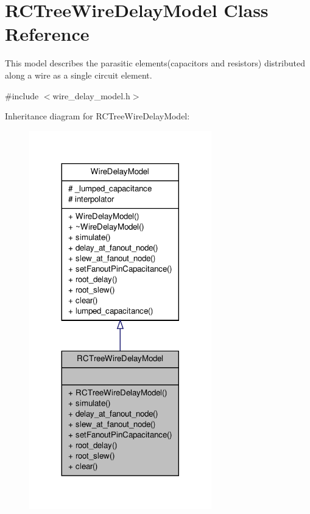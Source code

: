 \hypertarget{classRCTreeWireDelayModel}{\section{R\-C\-Tree\-Wire\-Delay\-Model Class Reference}
\label{classRCTreeWireDelayModel}
}


This model describes the parasitic elements(capacitors and resistors) distributed along a wire as a single circuit element.  




{\ttfamily \#include $<$wire\-\_\-delay\-\_\-model.\-h$>$}



Inheritance diagram for R\-C\-Tree\-Wire\-Delay\-Model\-:\nopagebreak
\begin{figure}[H]
\begin{center}
\leavevmode
\includegraphics[width=224pt]{classRCTreeWireDelayModel__inherit__graph}
\end{center}
\end{figure}



